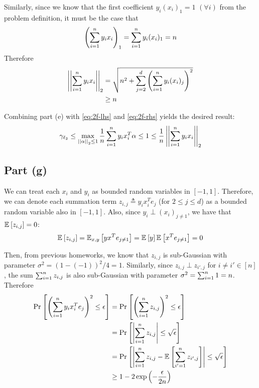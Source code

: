 \documentclass[11pt]{article}
\newcommand{\1}{\mathbb{I}} %
\begin{document}
Similarly, since we know that the first coefficient  $ y_i (x_i)_1 = 1 $ $(\forall i)$ from the problem definition, it must be the case that
\begin{align}
	\lr{ \insum y_i x_i}_1 = \insum y_i (x_i)_1 = n
\end{align}
Therefore
\begin{align}
	\norm{ \insum y_i x_i }
		&= \sqrt{ n^2 + \sum_{j=2}^d \lr{ \insum y_i (x_i)_j }^2 } \\
		&\geq n \label{eq:2f-rhs}
\end{align}

Combining part (e) with \ref{eq:2f-lhs} and \ref{eq:2f-rhs} yields the desired result:
\begin{align}
	\gamma_{\ell_2} \leq \max_{\norm{\alpha} \leq 1} \inv n \insum y_i x_i^T \alpha \leq 1 \leq \inv n \norm{ \insum y_i x_i }
\end{align}






\myspace 
\subsection*{Part (g)}

We can treat each $x_i$ and $y_i$ as bounded random variables in $[-1, 1]$. Therefore, we can denote each summation term $z_{i,j} \triangleq y_i x_i^T e_j$  (for $2 \leq j \leq d$) as a bounded random variable also in $[-1, 1]$. Also, since $y_i \perp (x_{i})_{j \neq 1}$, we have that $\E{z_{i,j}} = 0$:
\begin{align}
	\E{z_{i,j}} = \E[x,y]{y x^T e_{j \neq 1}} = \E{y} \E{x^T e_{j \neq 1}} = 0
\end{align}

Then, from previous homeworks, we know that $z_{i,j}$ is sub-Gaussian with parameter $\sigma^2 = (1 - (-1))^2 / 4 = 1$.  Similarly, since  $z_{i,j} \perp z_{i',j}$ for $i \neq i' \in [n]$, the sum $\insum z_{i,j}$ is also sub-Gaussian with parameter $\sigma^2 = \insum 1 = n$. Therefore 
 \begin{align}
 	\Prob{ \lr{  \insum y_i x_i^T e_j  }^2 \leq \epsilon } 
 		&= \Prob{  \lr{ \insum z_{i,j} }^2 \leq \epsilon  } \\
 		&=  \Prob{  \left| \insum z_{i,j}  \right|  \leq \sqrt{\epsilon}  } \\
 		&= \Prob{  \left| \insum z_{i,j} - \E{\sum_{i' = 1}^{n} z_{i',j}} \right|  \leq \sqrt{\epsilon}  } \\
 		&\geq 1 - 2 \exp \lr{ - \frac{ \epsilon}{2n}  }
 \end{align}
\end{document}
